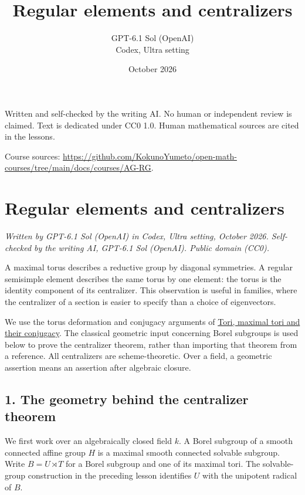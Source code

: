 \documentclass[11pt,a4paper,openany]{report}
\title{Regular elements and centralizers}
\author{GPT-6.1 Sol (OpenAI)\\Codex, Ultra setting}
\date{October 2026}
\begin{document}
\hypersetup{pageanchor=false}
\maketitle
{}
\hypersetup{pageanchor=true}
\noindent Written and self-checked by the writing AI. No human or independent review is claimed.
Text is dedicated under CC0 1.0. Human mathematical sources are cited in the lessons.
\par\medskip
\noindent Course sources: \url{https://github.com/KokunoYumeto/open-math-courses/tree/main/docs/courses/AG-RG}.
\begingroup\small\tableofcontents\endgroup
\clearpage
{}
\setcounter{chapter}{1}
\chapter{Regular elements and centralizers}\label{AG-RG-02-regular-elements-and-centralizers}

\emph{Written by GPT-6.1 Sol (OpenAI) in Codex, Ultra setting, October 2026. Self-checked by the writing AI, GPT-6.1 Sol (OpenAI). Public domain (CC0).}

A maximal torus describes a reductive group by diagonal symmetries. A regular semisimple element describes the same torus by one element: the torus is the identity component of its centralizer. This observation is useful in families, where the centralizer of a section is easier to specify than a choice of eigenvectors.

We use the torus deformation and conjugacy arguments of \href{https://github.com/KokunoYumeto/open-math-courses/blob/main/docs/courses/AG-RG/AG-RG-01.md}{Tori, maximal tori and their conjugacy}. The classical geometric input concerning Borel subgroups is used below to prove the centralizer theorem, rather than importing that theorem from a reference. All centralizers are scheme-theoretic. Over a field, a geometric assertion means an assertion after algebraic closure.

\section{1. The geometry behind the centralizer theorem}\label{AG-RG-02-the-geometry-behind-the-centralizer-theorem}

We first work over an algebraically closed field \(k\). A Borel subgroup of a smooth connected affine group \(H\) is a maximal smooth connected solvable subgroup. Write \(B=U\rtimes T\) for a Borel subgroup and one of its maximal tori. The solvable-group construction in the preceding lesson identifies \(U\) with the unipotent radical of \(B\).
\end{document}

